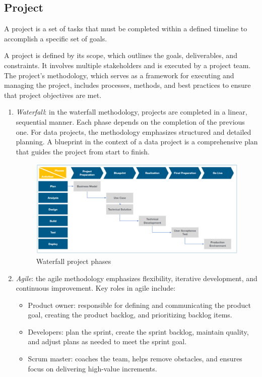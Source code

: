 \subsection{Project}
\begin{definition}
    A project is a set of tasks that must be completed within a defined timeline to accomplish a specific set of goals.
\end{definition}
\noindent A project is defined by its scope, which outlines the goals, deliverables, and constraints. 
    It involves multiple stakeholders and is executed by a project team. 
    The project's methodology, which serves as a framework for executing and managing the project, includes processes, methods, and best practices to ensure that project objectives are met.
\begin{enumerate}
    \item \textit{Waterfall}: in the waterfall methodology, projects are completed in a linear, sequential manner. 
        Each phase depends on the completion of the previous one. 
        For data projects, the methodology emphasizes structured and detailed planning.
        A blueprint in the context of a data project is a comprehensive plan that guides the project from start to finish.
        \begin{figure}[H]
            \centering
            \includegraphics[width=0.5\linewidth]{images/bis11.png}
            \caption{Waterfall project phases}
        \end{figure}
    \item \textit{Agile}: the agile methodology emphasizes flexibility, iterative development, and continuous improvement. 
        Key roles in agile include:
        \begin{itemize}
            \item Product owner: responsible for defining and communicating the product goal, creating the product backlog, and prioritizing backlog items.
            \item Developers: plan the sprint, create the sprint backlog, maintain quality, and adjust plans as needed to meet the sprint goal.
            \item Scrum master: coaches the team, helps remove obstacles, and ensures focus on delivering high-value increments.

\end{itemize}
\end{enumerate}
